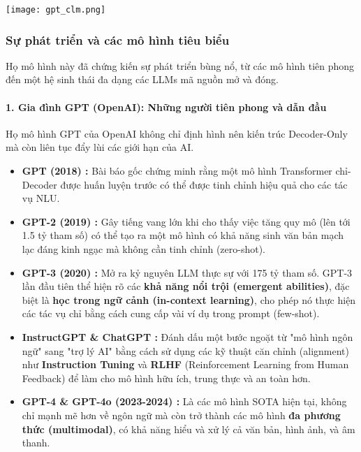 \begin{center}
    \texttt{[image: gpt\_clm.png]}
    \label{fig:gpt_clm}
\end{center}

\subsubsection{Sự phát triển và các mô hình tiêu biểu}
Họ mô hình này đã chứng kiến sự phát triển bùng nổ, từ các mô hình tiên phong đến một hệ sinh thái đa dạng các LLMs mã nguồn mở và đóng.

\paragraph{1. Gia đình GPT (OpenAI): Những người tiên phong và dẫn đầu}
Họ mô hình GPT của OpenAI không chỉ định hình nên kiến trúc Decoder-Only mà còn liên tục đẩy lùi các giới hạn của AI.
\begin{itemize}
    \item \textbf{GPT (2018) \cite{radford2018improving}:} Bài báo gốc chứng minh rằng một mô hình Transformer chỉ-Decoder được huấn luyện trước có thể được tinh chỉnh hiệu quả cho các tác vụ NLU.
    \item \textbf{GPT-2 (2019) \cite{radford2019language}:} Gây tiếng vang lớn khi cho thấy việc tăng quy mô (lên tới 1.5 tỷ tham số) có thể tạo ra một mô hình có khả năng sinh văn bản mạch lạc đáng kinh ngạc mà không cần tinh chỉnh (zero-shot).
    \item \textbf{GPT-3 (2020) \cite{brown2020language}:} Mở ra kỷ nguyên LLM thực sự với 175 tỷ tham số. GPT-3 lần đầu tiên thể hiện rõ các \textbf{khả năng nổi trội (emergent abilities)}, đặc biệt là \textbf{học trong ngữ cảnh (in-context learning)}, cho phép nó thực hiện các tác vụ chỉ bằng cách cung cấp vài ví dụ trong prompt (few-shot).
    \item \textbf{InstructGPT \& ChatGPT \cite{ouyang2022training}:} Đánh dấu một bước ngoặt từ "mô hình ngôn ngữ" sang "trợ lý AI" bằng cách sử dụng các kỹ thuật căn chỉnh (alignment) như \textbf{Instruction Tuning} và \textbf{RLHF} (Reinforcement Learning from Human Feedback) để làm cho mô hình hữu ích, trung thực và an toàn hơn.
    \item \textbf{GPT-4 \& GPT-4o (2023-2024) \cite{openai2023gpt4, openai2024gpt4o}:} Là các mô hình SOTA hiện tại, không chỉ mạnh mẽ hơn về ngôn ngữ mà còn trở thành các mô hình \textbf{đa phương thức (multimodal)}, có khả năng hiểu và xử lý cả văn bản, hình ảnh, và âm thanh.
\end{itemize}

